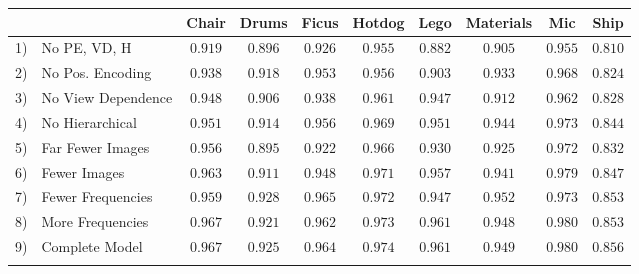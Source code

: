\documentclass[runningheads]{llncs}
\newcommand{\mbf}[1]{{\mathbf{#1}}}
\begin{document}
\begin{table}[t]
{\begin{tabular}{ll|cccccccc}
&& Chair & Drums & Ficus & Hotdog & Lego & Materials & Mic & Ship  \\
\hline
1) & No PE, VD, H              &      $0.919$  &      $0.896$  &      $0.926$  &      $0.955$  &      $0.882$  &      $0.905$  &      $0.955$  &      $0.810$  \\
2) & No Pos. Encoding          &      $0.938$  &      $0.918$  &      $0.953$  &      $0.956$  &      $0.903$  &      $0.933$  &      $0.968$  &      $0.824$  \\
3) & No View Dependence        &      $0.948$  &      $0.906$  &      $0.938$  &      $0.961$  &      $0.947$  &      $0.912$  &      $0.962$  &      $0.828$  \\
4) & No Hierarchical           &      $0.951$  &      $0.914$  &      $0.956$  &      $0.969$  &      $0.951$  &      $0.944$  &      $0.973$  &      $0.844$  \\
\arrayrulecolor{gray}
\hline
\arrayrulecolor{black}
5) & Far Fewer Images          &      $0.956$  &      $0.895$  &      $0.922$  &      $0.966$  &      $0.930$  &      $0.925$  &      $0.972$  &      $0.832$  \\
6) & Fewer Images              &      $0.963$  &      $0.911$  &      $0.948$  &      $0.971$  &      $0.957$  &      $0.941$  &      $0.979$  &      $0.847$  \\
\arrayrulecolor{gray}
\hline
\arrayrulecolor{black}
7) & Fewer Frequencies         &      $0.959$  & $\mbf{0.928}$ & $\mbf{0.965}$ &      $0.972$  &      $0.947$  & $\mbf{0.952}$ &      $0.973$  &      $0.853$  \\
8) & More Frequencies          &      $0.967$  &      $0.921$  &      $0.962$  &      $0.973$  &      $0.961$  &      $0.948$  & $\mbf{0.980}$ &      $0.853$  \\
\arrayrulecolor{gray}
\hline
\arrayrulecolor{black}
9) & Complete Model            & $\mbf{0.967}$ &      $0.925$  &      $0.964$  & $\mbf{0.974}$ & $\mbf{0.961}$ &      $0.949$  &      $0.980$  & $\mbf{0.856}$ \\
\hline
\multicolumn{9}{c}{}
\end{tabular}
} \vspace{2mm}
\end{table}
\end{document}
